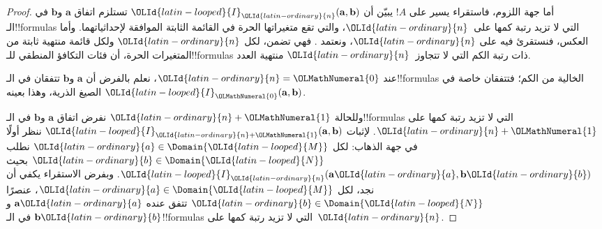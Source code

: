 \documentclass[../../../include/open-logic-section]{subfiles}
\begin{document}
\begin{proof}
  أما جهة اللزوم، فاستقراء يسير على $!A$ يبيّن أن
  ${\OLId{latin-looped}{I}}_{\OLId{latin-ordinary}{n}}(\mathbf{a},\mathbf{b})$ تستلزم اتفاق $\mathbf{a}$ و$\mathbf{b}$
  في الـ!!{formula}s التي لا تزيد رتبة كمها على~${\OLId{latin-ordinary}{n}}$، والتي تقع
  متغيراتها الحرة في القائمة الثابتة الموافقة لإحداثياتهما.
  وأما العكس، فنستقرئ فيه على ${\OLId{latin-ordinary}{n}}$، ونعتمد
  . فهي تضمن، لكل ${\OLId{latin-ordinary}{n}}$ ولكل قائمة منتهية
  ثابتة من المتغيرات الحرة، أن فئات التكافؤ المنطقي
  للـ!!{formula}s ذات رتبة الكم التي لا تتجاوز~${\OLId{latin-ordinary}{n}}$ منتهية العدد.

  عند ${\OLId{latin-ordinary}{n}}={\OLMathNumeral{0}}$، نعلم بالفرض أن $\mathbf{a}$ و$\mathbf{b}$ تتفقان
  في الـ!!{formula}s الخالية من الكم؛ فتتفقان خاصة في الصيغ
  الذرية، وهذا بعينه ${\OLId{latin-looped}{I}}_{\OLMathNumeral{0}}(\mathbf{a},\mathbf{b})$.

  وللحالة ${\OLId{latin-ordinary}{n}}+{\OLMathNumeral{1}}$ نفرض اتفاق $\mathbf{a}$ و$\mathbf{b}$ في
  الـ!!{formula}s التي لا تزيد رتبة كمها على ${\OLId{latin-ordinary}{n}}+{\OLMathNumeral{1}}$.
  لإثبات ${\OLId{latin-looped}{I}}_{{\OLId{latin-ordinary}{n}}+{\OLMathNumeral{1}}}(\mathbf{a},\mathbf{b})$ ننظر أولًا في جهة
  الذهاب: لكل ${\OLId{latin-ordinary}{a}} \in \Domain {\OLId{latin-looped}{M}}$ نطلب ${\OLId{latin-ordinary}{b}} \in \Domain {\OLId{latin-looped}{N}}$ بحيث
  ${\OLId{latin-looped}{I}}_{\OLId{latin-ordinary}{n}}(\mathbf{a}{\OLId{latin-ordinary}{a}},\mathbf{b}{\OLId{latin-ordinary}{b}})$. وبفرض الاستقراء يكفي أن
  نجد، لكل ${\OLId{latin-ordinary}{a}} \in \Domain {\OLId{latin-looped}{M}}$، عنصرًا ${\OLId{latin-ordinary}{b}} \in \Domain {\OLId{latin-looped}{N}}$
  تتفق عنده $\mathbf{a}{\OLId{latin-ordinary}{a}}$ و$\mathbf{b}{\OLId{latin-ordinary}{b}}$ في الـ!!{formula}s
  التي لا تزيد رتبة كمها على~${\OLId{latin-ordinary}{n}}$.


\end{proof}
\end{document}
